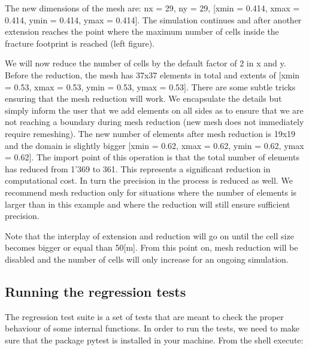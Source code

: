 \documentclass[letterpaper,10pt,english]{sphinxmanual}
\begin{document}
\noindent{}

\sphinxAtStartPar
The new dimensions of the mesh are: nx = 29, ny = 29, {[}xmin = \sphinxhyphen{}0.414, xmax = 0.414, ymin = \sphinxhyphen{}0.414, ymax = 0.414{]}. The
simulation continues and after another extension reaches the point where the maximum number of cells inside the fracture
footprint is reached (left figure).

\noindent{}

\noindent{}

\sphinxAtStartPar
We will now reduce the number of cells by the default factor of 2 in x and y. Before the reduction, the mesh has 37x37
elements in total and extents of {[}xmin = \sphinxhyphen{}0.53, xmax = 0.53, ymin = \sphinxhyphen{}0.53, ymax = 0.53{]}. There are some subtle tricks
ensuring that the mesh reduction will work. We encapsulate the details but simply inform the user that we add elements
on all sides as to ensure that we are not reaching a boundary during mesh reduction (new mesh does not immediately
require re\sphinxhyphen{}meshing). The new number of elements after mesh reduction is 19x19 and the domain is slightly bigger {[}xmin =
\sphinxhyphen{}0.62, xmax = 0.62, ymin = \sphinxhyphen{}0.62, ymax = 0.62{]}. The import point of this operation is that the total number of elements
has reduced from 1’369 to 361. This represents a significant reduction in computational cost. In turn the precision in
the process is reduced as well. We recommend mesh reduction only for situations where the number of elements is larger
than in this example and where the reduction will still ensure sufficient precision.

\sphinxAtStartPar
Note that the interplay of extension and reduction will go on until the cell size becomes bigger or equal than 50{[}m{]}.
From this point on, mesh reduction will be disabled and the number of cells will only increase for an ongoing
simulation.


\subsection{Running the regression tests}
\label{\detokenize{RunningASimulation:running-the-regression-tests}}
\sphinxAtStartPar
The regression test suite is a set of tests that are meant to check the proper behaviour of some internal functions. In order to run the tests, we need to make sure that the package pytest is installed in your machine. From the shell execute:
\end{document}
